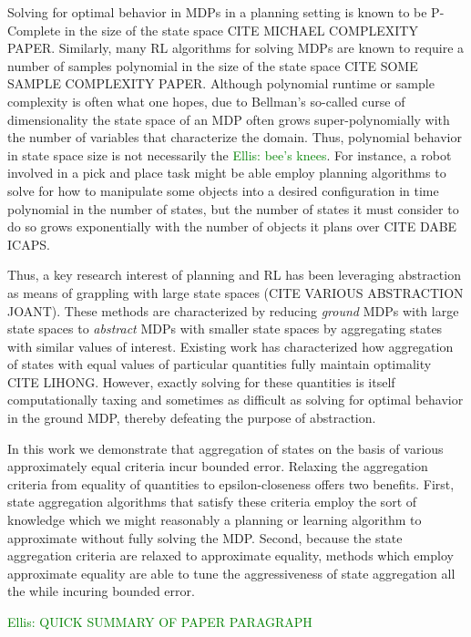 \documentclass{article}
\newcommand\enote[1]{\textcolor{green}{Ellis: #1}}
\begin{document}
Solving for optimal behavior in \acp{MDP} in a planning setting is known to be P-Complete in the size of the state space CITE MICHAEL COMPLEXITY PAPER. Similarly, many \ac{RL} algorithms for solving MDPs are known to require a number of samples polynomial in the size of the state space CITE SOME SAMPLE COMPLEXITY PAPER. Although polynomial runtime or sample complexity is often what one hopes, due to Bellman's so-called curse of dimensionality the state space of an MDP often grows super-polynomially with the number of variables that characterize the domain. Thus, polynomial behavior in state space size is not necessarily the \enote{bee's knees}. For instance, a robot involved in a pick and place task might be able employ planning algorithms to solve for how to manipulate some objects into a desired configuration in time polynomial in the number of states, but the number of states it must consider to do so grows exponentially with the number of objects it plans over CITE DABE ICAPS.

Thus, a key research interest of planning and RL has been leveraging abstraction as means of grappling with large state spaces (CITE VARIOUS ABSTRACTION JOANT). These methods are characterized by reducing \textit{ground} MDPs with large state spaces to \textit{abstract} MDPs with smaller state spaces by aggregating states with similar values of interest. Existing work has characterized how aggregation of states with equal values of particular quantities fully maintain optimality CITE LIHONG. However, exactly solving for these quantities is itself computationally taxing and sometimes as difficult as solving for optimal behavior in the ground MDP, thereby defeating the purpose of abstraction.

In this work we demonstrate that aggregation of states on the basis of various approximately equal criteria incur bounded error.  Relaxing the aggregation criteria from equality of quantities to epsilon-closeness offers two benefits. First, state aggregation algorithms that satisfy these criteria employ the sort of knowledge which we might reasonably a planning or learning algorithm to approximate without fully solving the MDP. Second, because the state aggregation criteria are relaxed to approximate equality, methods which employ approximate equality are able to tune the aggressiveness of state aggregation all the while incuring bounded error.
	
\enote{QUICK SUMMARY OF PAPER PARAGRAPH}
\end{document}
